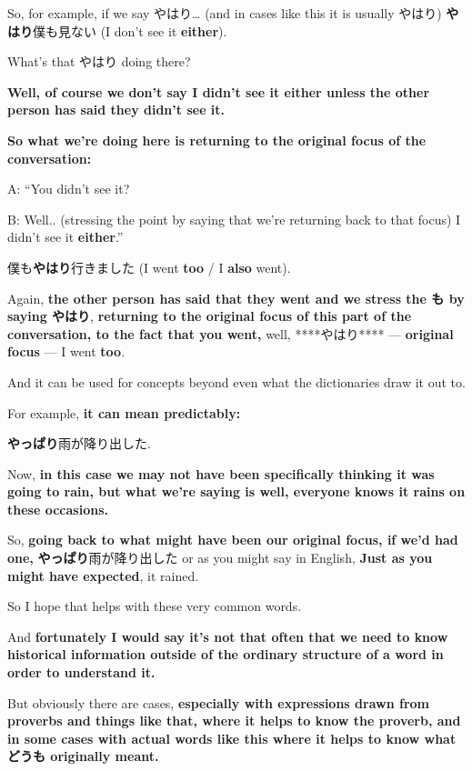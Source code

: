 So, for example, if we say やはり\ldots{} (and in cases like this it is usually やはり) {\bf やはり}僕も見ない (I don't see it {\bf either}).

{}

What's that やはり doing there?

{\bf Well, of course we don't say I didn't see it either unless the other person has said they didn't see it.}

{\bf So what we're doing here is returning to the original focus of the conversation:}

A: “You didn't see it?

B: Well.. (stressing the point by saying that we're returning back to that focus)\crlf
I didn't see it {\bf either}.”

\thinrule

僕も{\bf やはり}行きました (I went {\bf too} / I {\bf also} went).

Again, {\bf the other person has said that they went and we stress the も by saying やはり}, {\bf returning to the original focus of this part of the conversation, to the fact that you went,} well, ****やはり**** --- {\bf original focus} --- I went {\bf too}.

\thinrule

And it can be used for concepts beyond even what the dictionaries draw it out to.

For example, {\bf it can mean predictably:}

{\bf やっぱり}雨が降り出した.

{}

Now, {\bf in this case we may not have been specifically thinking it was going to rain, but what we're saying is well, everyone knows it rains on these occasions.}

So, {\bf going back to what might have been our original focus, if we'd had one,} {\bf やっぱり}雨が降り出した or as you might say in English, {\bf Just as you might have expected}, it rained.

\thinrule

So I hope that helps with these very common words.

And {\bf fortunately I would say it's not that often that we need to know historical information outside of the ordinary structure of a word in order to understand it.}

But obviously there are cases, {\bf especially with expressions drawn from proverbs and things like that, where it helps to know the proverb, and in some cases with actual words like this where it helps to know what どうも originally meant.}

